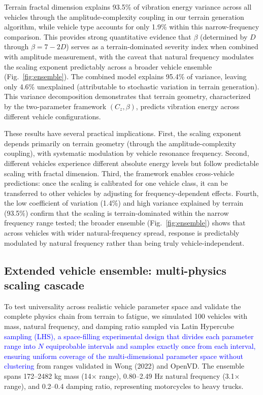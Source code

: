 \documentclass[11pt]{article}
\begin{document}
Terrain fractal dimension explains 93.5\% of vibration energy variance across all vehicles through the amplitude-complexity coupling in our terrain generation algorithm, while vehicle type accounts for only 1.9\% within this narrow-frequency comparison. This provides strong quantitative evidence that $\beta$ (determined by $D$ through $\beta = 7-2D$) serves as a terrain-dominated severity index when combined with amplitude measurement, with the caveat that natural frequency modulates the scaling exponent predictably across a broader vehicle ensemble (Fig.~\ref{fig:ensemble}). The combined model explains 95.4\% of variance, leaving only 4.6\% unexplained (attributable to stochastic variation in terrain generation). This variance decomposition demonstrates that terrain geometry, characterized by the two-parameter framework $(C_z, \beta)$, predicts vibration energy across different vehicle configurations.

These results have several practical implications. First, the scaling exponent depends primarily on terrain geometry (through the amplitude-complexity coupling), with systematic modulation by vehicle resonance frequency. Second, different vehicles experience different absolute energy levels but follow predictable scaling with fractal dimension. Third, the framework enables cross-vehicle predictions: once the scaling is calibrated for one vehicle class, it can be transferred to other vehicles by adjusting for frequency-dependent effects. Fourth, the low coefficient of variation (1.4\%) and high variance explained by terrain (93.5\%) confirm that the scaling is terrain-dominated within the narrow frequency range tested; the broader ensemble (Fig.~\ref{fig:ensemble}) shows that across vehicles with wider natural-frequency spread, response is predictably modulated by natural frequency rather than being truly vehicle-independent.


\subsection*{Extended vehicle ensemble: multi-physics scaling cascade}

To test universality across realistic vehicle parameter space and validate the complete physics chain from terrain to fatigue, we simulated 100 vehicles with mass, natural frequency, and damping ratio sampled via Latin Hypercube \textcolor{blue}{sampling (LHS), a space-filling experimental design that divides each parameter range into $N$ equiprobable intervals and samples exactly once from each interval, ensuring uniform coverage of the multi-dimensional parameter space without clustering\cite{McKay1979}} from ranges validated in Wong (2022)\cite{Wong2022} and OpenVD. The ensemble spans 172--2482 kg mass (14$\times$ range), 0.80--2.49 Hz natural frequency (3.1$\times$ range), and 0.2--0.4 damping ratio, representing motorcycles to heavy trucks.
\end{document}
